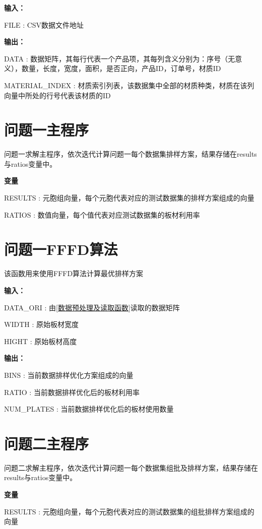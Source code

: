 \documentclass[bwprint]{gmcmthesis}
\begin{document}
\textbf{输入：} 

FILE : CSV数据文件地址

\textbf{输出：} 

DATA : 数据矩阵，其每行代表一个产品项，其每列含义分别为：序号（无意义），数量，长度，宽度，面积，是否正向，产品ID，订单号，材质ID

MATERIAL\_INDEX : 材质索引列表，该数据集中全部的材质种类，材质在该列向量中所处的行号代表该材质的ID


\newpage
\section{问题一主程序}
问题一求解主程序，依次迭代计算问题一每个数据集排样方案，结果存储在results与ratios变量中。

\textbf{变量}

RESULTS : 元胞组向量，每个元胞代表对应的测试数据集的排样方案组成的向量

RATIOS : 数值向量，每个值代表对应测试数据集的板材利用率


\newpage
\section{问题一FFFD算法}\label{问题一FFFD算法}
该函数用来使用FFFD算法计算最优排样方案

\textbf{输入：} 

DATA\_ORI : 由\ref{数据预处理及读取函数}读取的数据矩阵

WIDTH : 原始板材宽度

HIGHT : 原始板材高度

\textbf{输出：} 

BINS : 当前数据排样优化方案组成的向量

RATIO : 当前数据排样优化后的板材利用率

NUM\_PLATES : 当前数据排样优化后的板材使用数量



\newpage
\section{问题二主程序}
问题二求解主程序，依次迭代计算问题一每个数据集组批及排样方案，结果存储在results与ratios变量中。

\textbf{变量}

RESULTS : 元胞组向量，每个元胞代表对应的测试数据集的组批排样方案组成的向量
\end{document}
